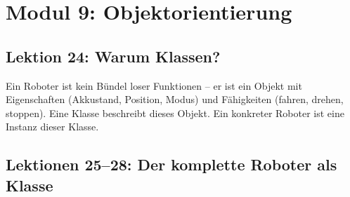 \chapter{Modul 9: Objektorientierung}

\section{Lektion 24: Warum Klassen?}

\begin{analogie}
Ein Roboter ist kein Bündel loser Funktionen -- er ist ein Objekt mit Eigenschaften (Akkustand, Position, Modus) und Fähigkeiten (fahren, drehen, stoppen). Eine Klasse beschreibt dieses Objekt. Ein konkreter Roboter ist eine Instanz dieser Klasse.
\end{analogie}

\section{Lektionen 25--28: Der komplette Roboter als Klasse}

